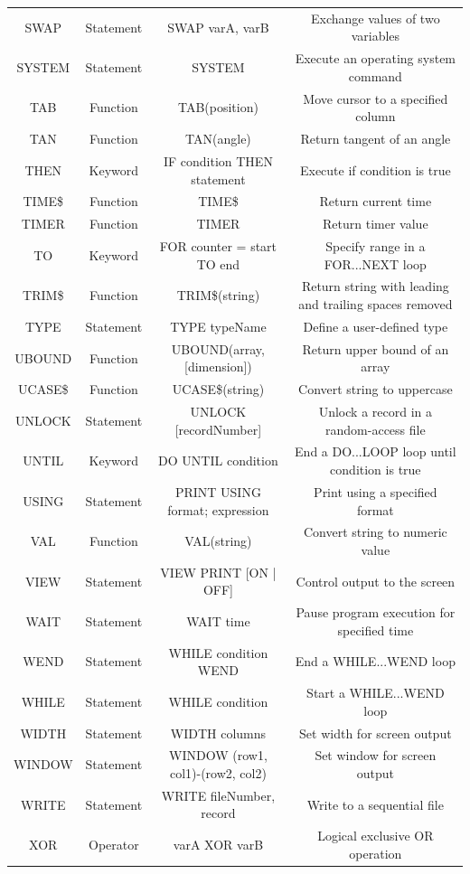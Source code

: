 \documentclass[10pt, reqno]{exam}
\begin{document}
{\begin{longtable}{|c|c|c|c|}
    SWAP & Statement & SWAP varA, varB & Exchange values of two variables \\
    SYSTEM & Statement & SYSTEM & Execute an operating system command \\
    TAB & Function & TAB(position) & Move cursor to a specified column \\
    TAN & Function & TAN(angle) & Return tangent of an angle \\
    THEN & Keyword & IF condition THEN statement & Execute if condition is true \\
    TIME\$ & Function & TIME\$ & Return current time \\
    TIMER & Function & TIMER & Return timer value \\
    TO & Keyword & FOR counter = start TO end & Specify range in a FOR...NEXT loop \\
    TRIM\$ & Function & TRIM\$(string) & Return string with leading and trailing spaces removed \\
    TYPE & Statement & TYPE typeName & Define a user-defined type \\
    UBOUND & Function & UBOUND(array, [dimension]) & Return upper bound of an array \\
    UCASE\$ & Function & UCASE\$(string) & Convert string to uppercase \\
    UNLOCK & Statement & UNLOCK [recordNumber] & Unlock a record in a random-access file \\
    UNTIL & Keyword & DO UNTIL condition & End a DO...LOOP loop until condition is true \\
    USING & Statement & PRINT USING format; expression & Print using a specified format \\
    VAL & Function & VAL(string) & Convert string to numeric value \\
    VIEW & Statement & VIEW PRINT [ON | OFF] & Control output to the screen \\
    WAIT & Statement & WAIT time & Pause program execution for specified time \\
    WEND & Statement & WHILE condition WEND & End a WHILE...WEND loop \\
    WHILE & Statement & WHILE condition & Start a WHILE...WEND loop \\
    WIDTH & Statement & WIDTH columns & Set width for screen output \\
    WINDOW & Statement & WINDOW (row1, col1)-(row2, col2) & Set window for screen output \\
    WRITE & Statement & WRITE fileNumber, record & Write to a sequential file \\
    XOR & Operator & varA XOR varB & Logical exclusive OR operation \\
    \hline
\end{longtable}
}
\end{document}
